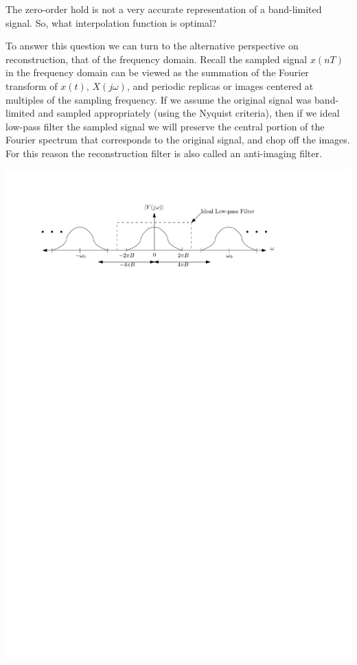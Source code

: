 The zero-order hold is not a very accurate representation of a band-limited signal. So, what interpolation function is optimal?

To answer this question we can turn to the alternative perspective on reconstruction, that of the frequency domain. Recall the sampled signal $x(nT)$ in the frequency domain can be viewed as the summation of the Fourier transform of $x(t)$, $X(j\omega)$, and periodic replicas or images centered at multiples of the sampling frequency. If we assume the original signal was band-limited and sampled appropriately (using the Nyquist criteria), then if we ideal low-pass filter the sampled signal we will preserve the central portion of the Fourier spectrum that corresponds to the original signal, and chop off the images. For this reason the reconstruction filter is also called an anti-imaging filter.

\begin{center}
  \includegraphics[scale=1]{graphics/bandlimitedreconstructed1.pdf}
\end{center}

